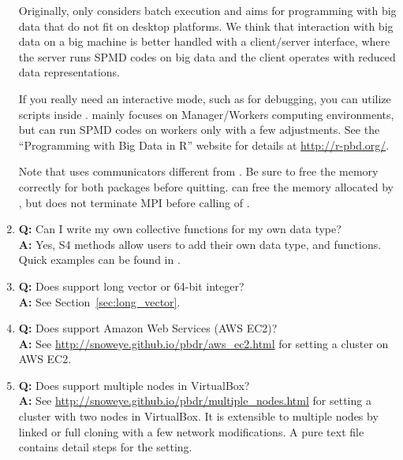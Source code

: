 \begin{enumerate}
      Originally,  only considers batch execution and
      aims for programming with big data that do not fit on desktop
      platforms. We think that interaction with big data on a big
      machine is better handled with a client/server interface, where
      the server runs SPMD codes on big data and the client operates
      with reduced data representations.

      If you really need an interactive mode, such as for debugging,
      you can utilize  scripts inside
      .  mainly focuses on Manager/Workers
      computing environments, but can run SPMD codes on workers only
      with a few adjustments. See the ``Programming with Big Data in R''
      website for details at \url{http://r-pbd.org/}.

      Note that  uses communicators different from
      .  Be sure to free the memory correctly for both
      packages before quitting. 
      can free the memory allocated by , but does not
      terminate MPI before calling  of .

\item {\bf\color{blue} Q:}
      Can I write my own collective functions for my own data type? \\
      {\bf\color{blue} A:}
      Yes, S4 methods allow users to add their own data type, and functions.
      Quick examples can be found in .

\item {\bf\color{blue} Q:}
      Does  support long vector or 64-bit integer? \\
      {\bf\color{blue} A:}
      See Section~\ref{sec:long_vector}.

\item {\bf\color{blue} Q:}
      Does  support Amazon Web Services (AWS EC2)? \\
      {\bf\color{blue} A:}
      See \url{http://snoweye.github.io/pbdr/aws_ec2.html}
      for setting a cluster on AWS EC2.

\item {\bf\color{blue} Q:}
      Does  support multiple nodes in VirtualBox? \\
      {\bf\color{blue} A:}
      See \url{http://snoweye.github.io/pbdr/multiple_nodes.html}
      for setting a cluster with two nodes in VirtualBox. It is extensible to
      multiple nodes by linked or full cloning with a few network modifications.
      A pure text file  contains detail steps for the
      setting.


\end{enumerate}
